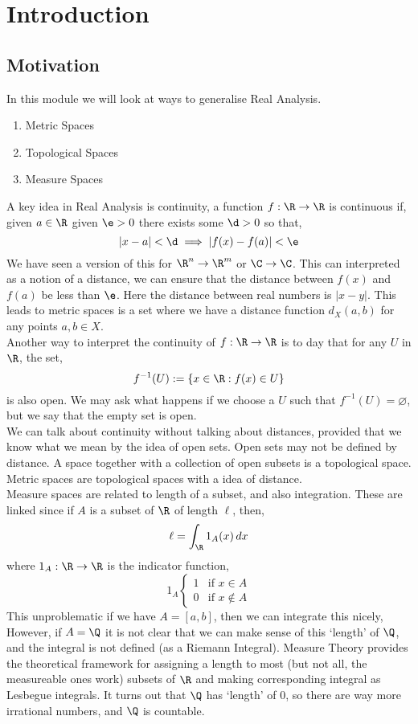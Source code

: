 
\section{Introduction}
\subsection{Motivation}

In this module we will look at ways to generalise Real Analysis.
\begin{enumerate}
  \item Metric Spaces
  \item Topological Spaces
  \item Measure Spaces
\end{enumerate}
A key idea in Real Analysis is continuity, a function $f : \R \to \R$ is continuous if, given $a \in \R$ given $\e > 0$ there exists some $\d > 0$ so that,
$$ |x - a| < \d \implies |f(x) - f(a)| < \e $$
We have seen a version of this for $\R^n \to \R^m$ or $\C \to \C$. This can interpreted as a notion of a distance, we can ensure that the distance between $f(x)$ and $f(a)$ be less than $\e$. Here the distance between real numbers is $|x - y|$. This leads to metric spaces is a set where we have a distance function $d_X(a, b)$ for any points $a, b \in X$.\\

\noindent
Another way to interpret the continuity of $f : \R \to \R$ is to day that for any $U$ in
$\R$, the set,
$$ f^{-1}(U) := \{x \in \R : f(x) \in U\} $$
is also open.
We may ask what happens if we choose a $U$ such that $f^{-1}(U) = \varnothing$, but we say that the empty set is open.\\

\noindent
We can talk about continuity without talking about distances, provided that we know what we mean by the idea of open sets. Open sets may not be defined by distance. A space together with a collection of open subsets is a topological space. Metric spaces are topological spaces with a idea of distance.\\

\noindent
Measure spaces are related to length of a subset, and also integration. These are linked since if $A$ is a subset of $\R$ of length $\ell$, then,
$$ \ell = \int_{\R} 1_A(x)\, dx $$
where $1_A : \R \to \R$ is the indicator function,
$$ 1_A \begin{cases}
  1 & \text{if $x \in A$}\\
  0 & \text{if $x \notin A$}
\end{cases} $$
This unproblematic if we have $A = [a, b]$, then we can integrate this nicely,
However, if $A = \Q$ it is not clear that we can make sense of this `length' of $\Q$, and the integral is not defined (as a Riemann Integral). Measure Theory provides the theoretical framework for assigning a length to most (but not all, the measureable ones work) subsets of $\R$ and making corresponding integral as Lesbegue integrals. It turns out that $\Q$ has `length' of $0$, so there are way more irrational numbers, and $\Q$ is countable.

